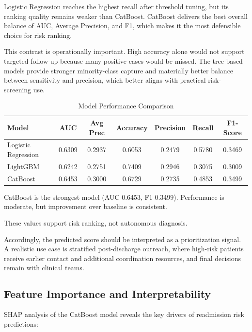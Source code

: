 \documentclass[conference]{IEEEtran}
\begin{document}
Logistic Regression reaches the highest recall after threshold tuning, but its ranking quality remains weaker than CatBoost. CatBoost delivers the best overall balance of AUC, Average Precision, and F1, which makes it the most defensible choice for risk ranking.

This contrast is operationally important. High accuracy alone would not support targeted follow-up because many positive cases would be missed. The tree-based models provide stronger minority-class capture and materially better balance between sensitivity and precision, which better aligns with practical risk-screening use.

\begin{table}[htbp]
\caption{Model Performance Comparison}
\begin{center}
\begin{tabular}{|l|c|c|c|c|c|c|}
\hline
\textbf{Model} & \textbf{AUC} & \textbf{Avg Prec} & \textbf{Accuracy} & \textbf{Precision} & \textbf{Recall} & \textbf{F1-Score} \\
\hline
Logistic Regression & 0.6309 & 0.2937 & 0.6053 & 0.2479 & 0.5780 & 0.3469 \\
LightGBM & 0.6242 & 0.2751 & 0.7409 & 0.2946 & 0.3075 & 0.3009 \\
CatBoost & 0.6453 & 0.3000 & 0.6729 & 0.2735 & 0.4853 & 0.3499 \\
\hline
\end{tabular}
\end{center}
\end{table}

CatBoost is the strongest model (AUC 0.6453, F1 0.3499). Performance is moderate, but improvement over baseline is consistent.

These values support risk ranking, not autonomous diagnosis.

Accordingly, the predicted score should be interpreted as a prioritization signal. A realistic use case is stratified post-discharge outreach, where high-risk patients receive earlier contact and additional coordination resources, and final decisions remain with clinical teams.

\subsection{Feature Importance and Interpretability}
SHAP analysis of the CatBoost model reveals the key drivers of readmission risk predictions:
\end{document}
